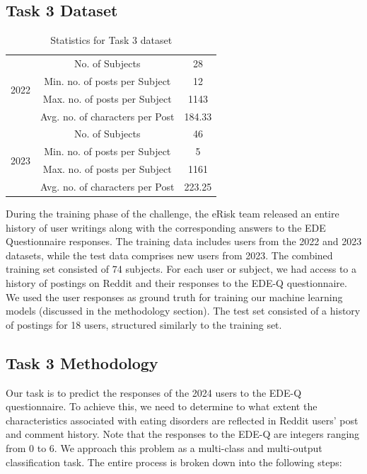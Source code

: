 \documentclass[]{style/ceurart}
\begin{document}
\subsection{Task 3 Dataset}

\begin{table}[h!]
\centering
\caption{Statistics for Task 3 dataset}
\begin{tabular}{|c|c|c|}
\hline
\multirow{4}{*}{2022} & No. of Subjects                 & 28     \\ \cline{2-3} 
                      & Min. no. of posts per Subject   & 12     \\ \cline{2-3} 
                      & Max. no. of posts per Subject   & 1143   \\ \cline{2-3} 
                      & Avg. no. of characters per Post & 184.33 \\ \hline
\multirow{4}{*}{2023} & No. of Subjects                 & 46     \\ \cline{2-3} 
                      & Min. no. of posts per Subject   & 5      \\ \cline{2-3} 
                      & Max. no. of posts per Subject   & 1161   \\ \cline{2-3} 
                      & Avg. no. of characters per Post & 223.25 \\ \hline
\end{tabular}
\end{table}

During the training phase of the challenge, the eRisk team released an entire history of user writings along with the corresponding answers to the EDE Questionnaire responses. The training data includes users from the 2022 and 2023 datasets, while the test data comprises new users from 2023. The combined training set consisted of 74 subjects. For each user or subject, we had access to a history of postings on Reddit and their responses to the EDE-Q questionnaire. We used the user responses as ground truth for training our machine learning models (discussed in the methodology section). The test set consisted of a history of postings for 18 users, structured similarly to the training set.



\subsection{Task 3 Methodology}

Our task is to predict the responses of the 2024 users to the EDE-Q questionnaire. To achieve this, we need to determine to what extent the characteristics associated with eating disorders are reflected in Reddit users' post and comment history. Note that the responses to the EDE-Q are integers ranging from 0 to 6. We approach this problem as a multi-class and multi-output classification task. The entire process is broken down into the following steps:
\end{document}
